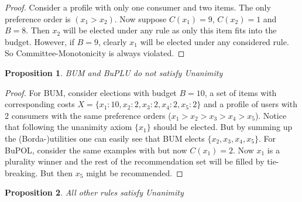 \documentclass{article}
\newtheorem{mytheorem}{Proposition}
\begin{document}
\begin{proof}\renewcommand{\qedsymbol}{}
Consider a profile with only one consumer and two items. The only preference order is $(x_1 > x_2)$. Now suppose $C(x_1) = 9$, $C(x_2)=1$ and $B=8$. Then $x_2$ will be elected under any rule as only this item fits into the budget. However, if $B=9$, clearly $x_1$ will be elected under any considered rule. So Committee-Monotonicity is always violated.
\end{proof}
\begin{mytheorem}
BUM and BuPLU do not satisfy Unanimity
\end{mytheorem}
\begin{proof}\renewcommand{\qedsymbol}{}\renewcommand{\qedsymbol}{}

For BUM, consider elections with budget $B=10$, a set of items with corresponding costs $X= \{x_1:10, x_2:2, x_3:2, x_4:2, x_5:2\}$ and a profile of users with 2 consumers with the same preference orders ($x_1 > x_2 >x_3 > x_4 > x_5$).
Notice that following the unanimity axiom $\{x_1 \}$ should be elected. But by summing up the (Borda-)utilities one can easily see that BUM elects $\{ x_2, x_3, x_4, x_5\}$.
For BuPOL, consider the same examples with but now $C(x_1)=2$. Now $x_1$ is a plurality winner and the rest of the recommendation set will be filled by tie-breaking. But then $x_5$ might be recommended.
\end{proof}
\begin{mytheorem}
All other rules satisfy Unanimity
\end{mytheorem}
\end{document}
